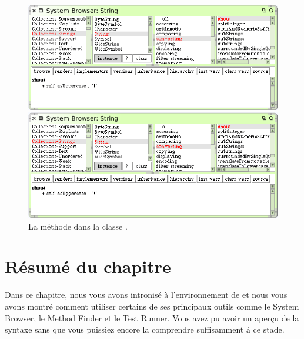 \documentclass[a4paper,10pt,twoside]{book}
\begin{document}
\begin{figure}[hbt]
\ifluluelse
	{\centerline{\includegraphics[width=\textwidth]{String-Shout}}}
	{\centerline{\includegraphics[scale=0.7]{String-Shout}}}
\caption{La m\'ethode  dans la classe .\label{fig:String-shout}}
\end{figure}

\section{R\'esum\'e du chapitre}
Dans ce chapitre, nous vous avons intronis\'e \`a l'environnement de
\sq et nous vous avons montr\'e comment utiliser certains de ses
principaux outils comme le  System Browser, le
Method Finder et le Test Runner. Vous avez pu avoir un aper\c{c}u de la
syntaxe sans que vous puissiez encore la comprendre suffisamment \`a ce stade.
\end{document}
